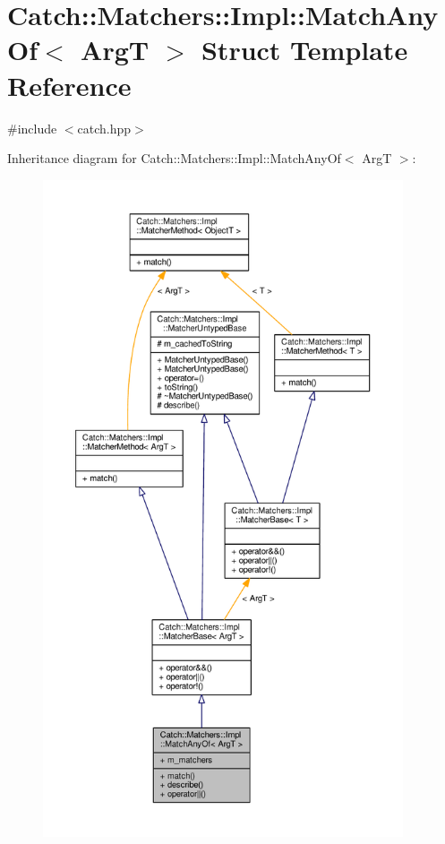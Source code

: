 \hypertarget{struct_catch_1_1_matchers_1_1_impl_1_1_match_any_of}{\section{Catch\-:\-:Matchers\-:\-:Impl\-:\-:Match\-Any\-Of$<$ Arg\-T $>$ Struct Template Reference}
\label{struct_catch_1_1_matchers_1_1_impl_1_1_match_any_of}
}


{\ttfamily \#include $<$catch.\-hpp$>$}



Inheritance diagram for Catch\-:\-:Matchers\-:\-:Impl\-:\-:Match\-Any\-Of$<$ Arg\-T $>$\-:
\nopagebreak
\begin{figure}[H]
\begin{center}
\leavevmode
\includegraphics[height=550pt]{struct_catch_1_1_matchers_1_1_impl_1_1_match_any_of__inherit__graph}
\end{center}
\end{figure}


